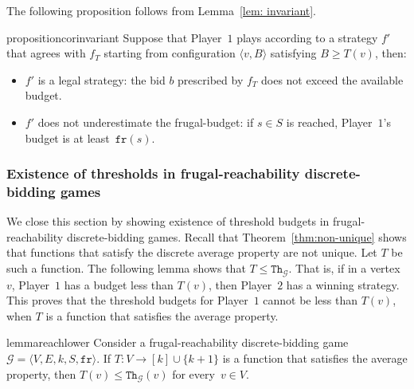 \documentclass{theoretics}
\newcommand{\PO}{Player~$1$\xspace}
\newcommand{\PT}{Player~$2$\xspace}
\newcommand{\G}{{\mathcal G}}
\newcommand{\fr}{\texttt{fr}}
\newcommand{\thresh}{\texttt{Th}\xspace}
\newcommand{\zug}[1]{\langle #1  \rangle}
\begin{document}
The following proposition follows from Lemma~\ref{lem: invariant}.








\begin{restatable}{proposition}{corinvariant}
	\label{prop: corinvariant}
	Suppose that \PO plays according to a strategy $f'$ that agrees with \(f_T\) starting from configuration \(\zug{v, B}\) satisfying \(B \geq T(v)\), then:  	
	\begin{itemize}
	\item $f'$ is a legal strategy: the bid $b$ prescribed by $f_T$ does not exceed the available budget.
	\item $f'$ does not underestimate the frugal-budget: if \(s \in S\) is reached, \PO's budget is at least~\(\fr(s)\). 
	\end{itemize}
\end{restatable}






\subsubsection{Existence of thresholds in frugal-reachability discrete-bidding games}
We close this section by showing existence of threshold budgets in frugal-reachability discrete-bidding games. 
Recall that Theorem~\ref{thm:non-unique} shows that functions that satisfy the discrete average property are not unique. 
Let \(T\) be such a function.
The following lemma shows that \(T \leq \thresh_{\G}\). 
That is, if in a vertex \(v\), \PO has a budget less than \(T(v)\), then \PT has a winning strategy.
This proves that the threshold budgets for \PO cannot be less than \(T(v)\), when \(T\) is a function that satisfies the average property.




\begin{restatable}{lemma}{reachlower}
	\label{lem:reach-lower}
	Consider a frugal-reachability discrete-bidding game \(\G = \zug{V, E, k, S, \fr}\). If \(T: V \rightarrow [k] \cup \{k+1\}\) is a function that satisfies the average property, then \(T(v) \leq \thresh_{\G}(v)\) for every~\(v \in V\). 
\end{restatable}
\end{document}

